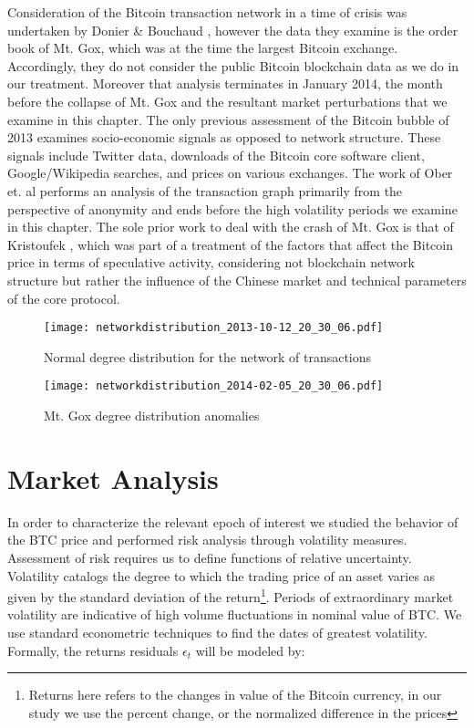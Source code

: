 Consideration of the Bitcoin transaction network in a time of crisis was undertaken by Donier \& Bouchaud \cite{donier2015markets}, however the data they examine is the order book of Mt. Gox, which was at the time the largest Bitcoin exchange. 
Accordingly, they do not consider the public Bitcoin blockchain data as we do in our treatment. 
Moreover that analysis terminates in January 2014, the month before the collapse of Mt. Gox and the resultant market perturbations that we examine in this chapter. 
The only previous assessment of the Bitcoin bubble of 2013 \cite{garcia2014digital} examines socio-economic signals as opposed to network structure. 
These signals include Twitter data, downloads of the Bitcoin core software client, Google/Wikipedia searches, and prices on various exchanges. 
The work of Ober et. al \cite{ober2013structure} performs an analysis of the transaction graph primarily from the perspective of anonymity and ends before the high volatility periods we examine in this chapter. 
The sole prior work to deal with the crash of Mt. Gox is that of Kristoufek \cite{kristoufek2015main}, which was part of a treatment of the factors that affect the Bitcoin price in terms of speculative activity, considering not blockchain network structure but rather the influence of the Chinese market and technical parameters of the core protocol. 

\begin{figure}
  \centering
    \texttt{[image: networkdistribution\_2013-10-12\_20\_30\_06.pdf]}
  \caption{Normal degree distribution for the network of transactions}
  \label{fig:paretonormal}
\end{figure}

\begin{figure}
  \centering
    \texttt{[image: networkdistribution\_2014-02-05\_20\_30\_06.pdf]}
  \caption{Mt. Gox degree distribution anomalies}
  \label{fig:anomaly}
\end{figure}

\section{Market Analysis}

In order to characterize the relevant epoch of interest we studied the behavior of the BTC price and performed risk analysis through volatility measures. 
Assessment of risk requires us to define functions of relative uncertainty. 
Volatility catalogs the degree to which the trading price of an asset varies as given by the standard deviation of the return\footnote{Returns here refers to the changes in value of the Bitcoin currency, in our study we use the percent change, or the normalized difference in the prices}. 
Periods of extraordinary market volatility are indicative of high volume fluctuations in nominal value of BTC. We use standard econometric \cite{GARCH} techniques to find the dates of greatest volatility.
Formally, the returns residuals $\epsilon_t$ will be modeled by:

